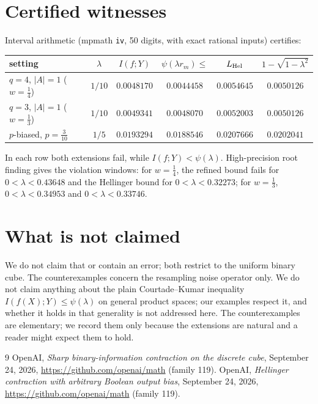 \documentclass[11pt]{amsart}
\theoremstyle{remark}
\begin{document}
\section{Certified witnesses}
Interval arithmetic (mpmath \texttt{iv}, 50 digits, with exact rational inputs) certifies:

\begin{center}
\begin{tabular}{lccccc}
\toprule
setting & $\lambda$ & $I(f;Y)$ & $\psi(\lambda r_m)\le$ & $L_{\rm Hel}$ & $1-\sqrt{1-\lambda^2}$\\
\midrule
$q=4$, $|A|=1$ ($w=\tfrac14$) & $1/10$ & $0.0048170$ & $0.0044458$ & $0.0054645$ & $0.0050126$\\
$q=3$, $|A|=1$ ($w=\tfrac13$) & $1/10$ & $0.0049341$ & $0.0048070$ & $0.0052003$ & $0.0050126$\\
$p$-biased, $p=\tfrac{3}{10}$ & $1/5$ & $0.0193294$ & $0.0188546$ & $0.0207666$ & $0.0202041$\\
\bottomrule
\end{tabular}
\end{center}
In each row both extensions fail, while $I(f;Y)<\psi(\lambda)$. High-precision root finding gives
the violation windows: for $w=\tfrac14$, the refined bound fails for $0<\lambda<0.43648$ and the
Hellinger bound for $0<\lambda<0.32273$; for $w=\tfrac13$, $0<\lambda<0.34953$ and
$0<\lambda<0.33746$.

\section{What is not claimed}
We do not claim that \cite{oai-ck} or \cite{oai-hel} contain an error; both restrict to the uniform
binary cube. The counterexamples concern the resampling noise operator only. We do not claim anything about the plain Courtade--Kumar inequality
$I(f(X);Y)\le\psi(\lambda)$ on general product spaces; our examples respect it, and whether it holds
in that generality is not addressed here. The counterexamples are elementary; we record them only
because the extensions are natural and a reader might expect them to hold.

\begin{thebibliography}{9}
 OpenAI, \emph{Sharp binary-information contraction on the discrete cube},
September 24, 2026, \url{https://github.com/openai/math} (family 119).
 OpenAI, \emph{Hellinger contraction with arbitrary Boolean output bias},
September 24, 2026, \url{https://github.com/openai/math} (family 119).
\end{thebibliography}
\end{document}
